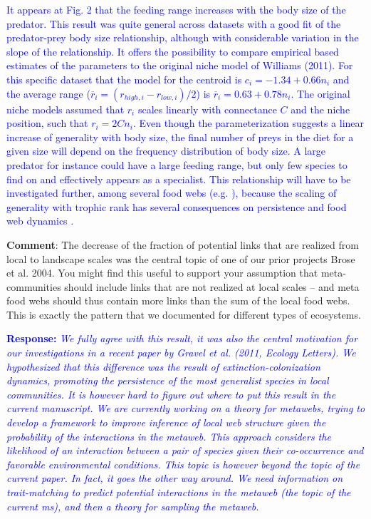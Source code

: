 \documentclass [12pt,onecolumn,twoside,openright]{report}
\begin{document}
\begin{onehalfspacing}
\medskip\textcolor{blue}{It appears at Fig. 2 that the feeding range increases with the body size of the predator. This result was quite general across datasets with a good fit of the predator-prey body size relationship, although with considerable variation in the slope of the relationship. It offers the possibility to compare empirical based estimates of the parameters to the original niche model of Williams (2011). For this specific dataset that the model for the centroid is $c_i = -1.34 + 0.66n_i$ and the average range ($\overline{r}_i=(r_{high,i} - r_{low,i})/2$) is $\overline{r}_i = 0.63 + 0.78n_i$. The original niche models assumed that $r_i$ scales linearly with connectance $C$ and the niche position, such that $r_i = 2Cn_i$. Even though the parameterization suggests a linear increase of generality with body size, the final number of preys in the diet for a given size will depend on the frequency distribution of body size. A large predator for instance could have a large feeding range, but only few species to find on and effectively appears as a specialist. This relationship will have to be investigated further, among several food webs (e.g. \textcite{Digel2011}), because the scaling of generality with trophic rank has several consequences on persistence \parencite{Gravel2011b} and food web dynamics \parencite{Brose2006,Berlow2009}.}

\medskip \textbf{Comment}: The decrease of the fraction of
potential links that are realized from local to landscape scales was the central
topic of one of our prior projects Brose et al. 2004. You might find this
useful to support your assumption that meta-communities should include links
that are not realized at local scales – and meta food webs should thus contain
more links than the sum of the local food webs. This is exactly the pattern that
we documented for different types of ecosystems.

\medskip \textcolor{blue}{\textbf{Response:}} \textit{\textcolor{blue}{We fully agree with this result, it was also the central motivation for our investigations in a recent paper by Gravel et al. (2011, Ecology Letters). We hypothesized that this difference was the result of extinction-colonization dynamics, promoting the persistence of the most generalist species in local communities. It is however hard to figure out where to put this result in the current manuscript. We are currently working on a theory for metawebs, trying to develop a framework to improve inference of local web structure given the probability of the interactions in the metaweb. This approach considers the likelihood of an interaction between a pair of species given their co-occurrence and favorable environmental conditions. This topic is however beyond the topic of the current paper. In fact, it goes the other way around. We need information on trait-matching to predict potential interactions in the metaweb (the topic of the current ms), and then a theory for sampling the metaweb.}}


\end{onehalfspacing}
\end{document}
